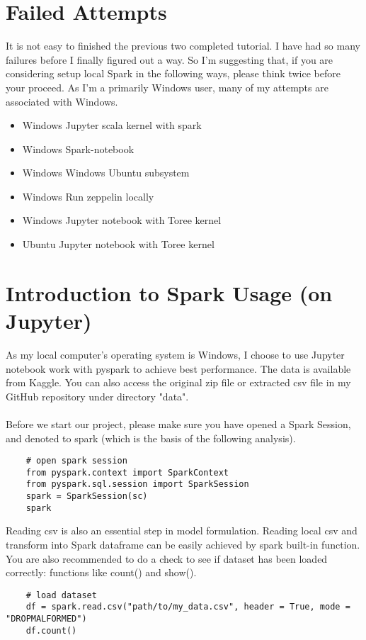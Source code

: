 \documentclass[a4paper, 12pt]{article}
\begin{document}
    \section*{Failed Attempts}
    It is not easy to finished the previous two completed tutorial. I have had so many failures before 
    I finally figured out a way. So I'm suggesting that, if you are considering setup local Spark in 
    the following ways, please think twice before your proceed. As I'm a primarily Windows user, many of 
    my attempts are associated with Windows.
    \begin{itemize}
        \item Windows Jupyter scala kernel with spark
        \item Windows Spark-notebook
        \item Windows Windows Ubuntu subsystem
        \item Windows Run zeppelin locally
        \item Windows Jupyter notebook with Toree kernel
        \item Ubuntu Jupyter notebook with Toree kernel
    \end{itemize}
    
    \section*{Introduction to Spark Usage (on Jupyter)}
    As my local computer's operating system is Windows, I choose to use Jupyter notebook work with pyspark
    to achieve best performance. The data is available from Kaggle\cite{datakaggle}. You can also access 
    the original zip file or extracted csv file in my GitHub repository under directory "data".\\
    \\
    Before we start our project, please make sure you have opened a Spark Session, and denoted to spark 
    (which is the basis of the following analysis).
    \begin{verbatim}
    # open spark session
    from pyspark.context import SparkContext
    from pyspark.sql.session import SparkSession
    spark = SparkSession(sc)
    spark
    \end{verbatim}
    
    Reading csv is also an essential step in model formulation. Reading local csv and transform into 
    Spark dataframe can be easily achieved by spark built-in function. You are also recommended to do 
    a check to see if dataset has been loaded correctly: functions like count() and show().
    \begin{verbatim}
    # load dataset
    df = spark.read.csv("path/to/my_data.csv", header = True, mode = "DROPMALFORMED")
    df.count()
    \end{verbatim}
\end{document}
